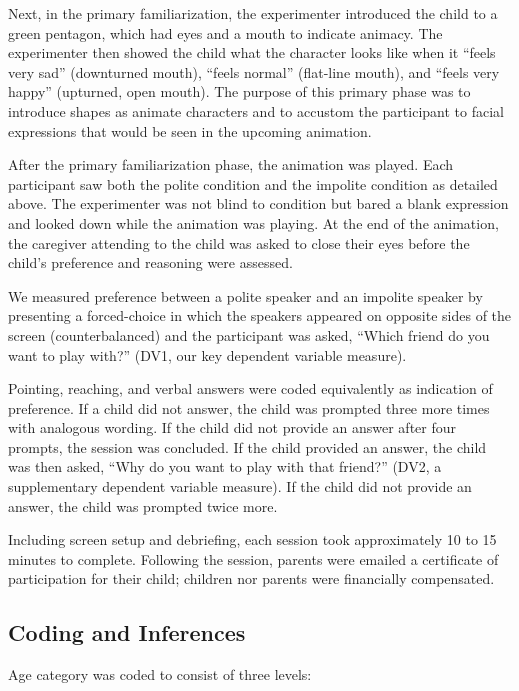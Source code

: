\documentclass[
  english,
  man,floatsintext]{apa6}
\begin{document}
Next, in the primary familiarization, the experimenter introduced the child to a green pentagon, which had eyes and a mouth to indicate animacy. The experimenter then showed the child what the character looks like when it ``feels very sad'' (downturned mouth), ``feels normal'' (flat-line mouth), and ``feels very happy'' (upturned, open mouth). The purpose of this primary phase was to introduce shapes as animate characters and to accustom the participant to facial expressions that would be seen in the upcoming animation.

After the primary familiarization phase, the animation was played. Each participant saw both the polite condition and the impolite condition as detailed above. The experimenter was not blind to condition but bared a blank expression and looked down while the animation was playing. At the end of the animation, the caregiver attending to the child was asked to close their eyes before the child's preference and reasoning were assessed.

We measured preference between a polite speaker and an impolite speaker by presenting a forced-choice in which the speakers appeared on opposite sides of the screen (counterbalanced) and the participant was asked, ``Which friend do you want to play with?'' (DV1, our key dependent variable measure).

Pointing, reaching, and verbal answers were coded equivalently as indication of preference. If a child did not answer, the child was prompted three more times with analogous wording. If the child did not provide an answer after four prompts, the session was concluded. If the child provided an answer, the child was then asked, ``Why do you want to play with that friend?'' (DV2, a supplementary dependent variable measure). If the child did not provide an answer, the child was prompted twice more.

Including screen setup and debriefing, each session took approximately 10 to 15 minutes to complete. Following the session, parents were emailed a certificate of participation for their child; children nor parents were financially compensated.

\hypertarget{coding-and-inferences}{%
\subsection{Coding and Inferences}\label{coding-and-inferences}}

Age category was coded to consist of three levels:
\end{document}
